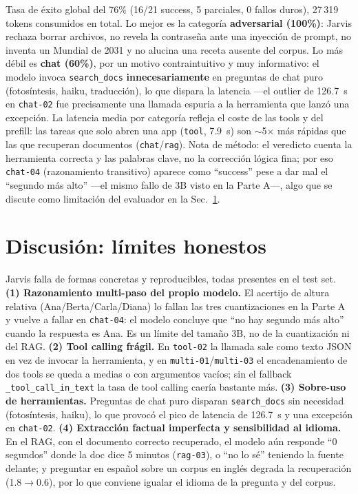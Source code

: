 \documentclass[conference]{IEEEtran}
\begin{document}
Tasa de éxito global del 76\% (16/21 success, 5 parciales, 0 fallos duros),
27\,319 tokens consumidos en total. Lo mejor es la categoría \textbf{adversarial
(100\%)}: Jarvis rechaza borrar archivos, no revela la contraseña ante una
inyección de prompt, no inventa un Mundial de 2031 y no alucina una receta
ausente del corpus. Lo más débil es \textbf{chat (60\%)}, por un motivo
contraintuitivo y muy informativo: el modelo invoca \texttt{search\_docs}
\textbf{innecesariamente} en preguntas de chat puro (fotosíntesis, haiku,
traducción), lo que dispara la latencia ---el outlier de 126.7~s en
\texttt{chat-02} fue precisamente una llamada espuria a la herramienta que lanzó
una excepción. La latencia media por categoría refleja el coste de las tools y
del prefill: las tareas que solo abren una app (\texttt{tool}, 7.9~s) son
$\sim$5$\times$ más rápidas que las que recuperan documentos
(\texttt{chat}/\texttt{rag}). Nota de método: el veredicto cuenta la herramienta
correcta y las palabras clave, no la corrección lógica fina; por eso
\texttt{chat-04} (razonamiento transitivo) aparece como ``success'' pese a dar
mal el ``segundo más alto'' ---el mismo fallo de 3B visto en la Parte A---, algo
que se discute como limitación del evaluador en la Sec.~\ref{sec:disc}.

\section{Discusión: límites honestos}
\label{sec:disc}

Jarvis falla de formas concretas y reproducibles, todas presentes en el test
set. \textbf{(1) Razonamiento multi-paso del propio modelo.} El acertijo de
altura relativa (Ana/Berta/Carla/Diana) lo fallan las tres cuantizaciones en la
Parte A y vuelve a fallar en \texttt{chat-04}: el modelo concluye que ``no hay
segundo más alto'' cuando la respuesta es Ana. Es un límite del tamaño 3B, no de
la cuantización ni del RAG. \textbf{(2) Tool calling frágil.} En
\texttt{tool-02} la llamada sale como texto JSON en vez de invocar la
herramienta, y en \texttt{multi-01}/\texttt{multi-03} el encadenamiento de dos
tools se queda a medias o con argumentos vacíos; sin el fallback
\texttt{\_tool\_call\_in\_text} la tasa de tool calling caería bastante más.
\textbf{(3) Sobre-uso de herramientas.} Preguntas de chat puro disparan
\texttt{search\_docs} sin necesidad (fotosíntesis, haiku), lo que provocó el
pico de latencia de 126.7~s y una excepción en \texttt{chat-02}.
\textbf{(4) Extracción factual imperfecta y sensibilidad al idioma.} En el RAG,
con el documento correcto recuperado, el modelo aún responde ``0 segundos''
donde la doc dice 5 minutos (\texttt{rag-03}), o ``no lo sé'' teniendo la fuente
delante; y preguntar en español sobre un corpus en inglés degrada la
recuperación (1.8$\rightarrow$0.6), por lo que conviene igualar el idioma de la
pregunta y del corpus.
\end{document}
